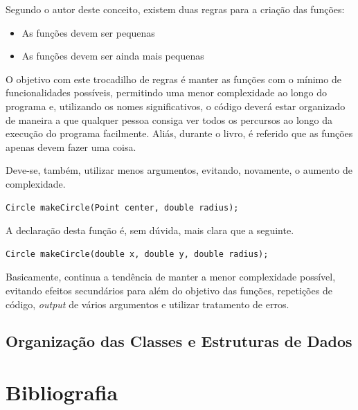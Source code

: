 \documentclass[10pt,portuguese]{article}
\begin{document}
\par Segundo o autor deste conceito, existem duas regras para a criação das funções:

\begin{itemize}
    \item As funções devem ser pequenas
    \item As funções devem ser ainda mais pequenas
\end{itemize}

\par O objetivo com este trocadilho de regras é manter as funções com o mínimo de funcionalidades possíveis, permitindo uma menor complexidade ao longo do programa e, utilizando os nomes significativos, o código deverá estar organizado de maneira a que qualquer pessoa consiga ver todos os percursos ao longo da execução do programa facilmente. Aliás, durante o livro, é referido que as funções apenas devem fazer uma coisa.

\par Deve-se, também, utilizar menos argumentos, evitando, novamente, o aumento de complexidade. 
\begin{lstlisting}
Circle makeCircle(Point center, double radius);
\end{lstlisting}

\par A declaração desta função é, sem dúvida, mais clara que a seguinte.

\begin{lstlisting}
Circle makeCircle(double x, double y, double radius);
\end{lstlisting}

\par Basicamente, continua a tendência de manter a menor complexidade possível, evitando efeitos secundários para além do objetivo das funções, repetições de código, \textit{output} de vários argumentos e utilizar tratamento de erros.

\subsection{Organização das Classes e Estruturas de Dados}

\clearpage

\section{Bibliografia}


\end{document}
